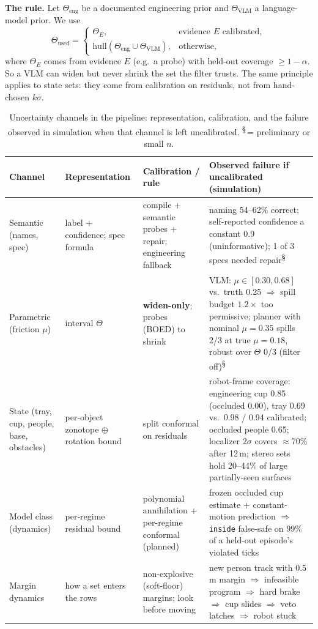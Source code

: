 \documentclass[10pt,twocolumn,letterpaper]{article}
\newcommand{\pre}{\textsuperscript{\S}}   %
\begin{document}
\textbf{The rule.} Let $\Theta_{\mathrm{eng}}$ be a documented engineering prior and $\Theta_{\mathrm{VLM}}$ a language-model prior. We use
\begin{equation}
\Theta_{\mathrm{used}}=\begin{cases}\Theta_E, & \text{evidence }E\text{ calibrated},\\
\mathrm{hull}(\Theta_{\mathrm{eng}}\cup\Theta_{\mathrm{VLM}}), & \text{otherwise,}\end{cases}
\end{equation}
where $\Theta_E$ comes from evidence $E$ (e.g.\ a probe) with held-out coverage $\ge1-\alpha$. So a VLM can widen but never shrink the set the filter trusts. The same principle applies to state sets: they come from calibration on
residuals, not from hand-chosen $k\sigma$.

\begin{table}[t]
\centering\footnotesize
\caption{Uncertainty channels in the pipeline: representation, calibration, and the failure observed in simulation when that channel
is left uncalibrated. \pre\,= preliminary or small $n$.}
\label{tab:uq}
\begin{tabular}{@{}p{2.6cm}p{2.9cm}p{3.3cm}p{7.3cm}@{}}
\toprule
Channel & Representation & Calibration / rule & Observed failure if uncalibrated (simulation)\\
\midrule
Semantic (names, spec) & label + confidence; spec formula & compile + semantic probes + repair; engineering fallback &
naming 54--62\% correct; self-reported confidence a constant 0.9 (uninformative); 1 of 3 specs needed repair\pre\\
Parametric (friction $\mu$) & interval $\Theta$ & \textbf{widen-only}; probes (BOED) to shrink &
VLM: $\mu\in[0.30,0.68]$ vs.\ truth 0.25 $\Rightarrow$ spill budget $1.2\times$ too permissive; planner with nominal $\mu{=}0.35$ spills 2/3 at true $\mu{=}0.18$, robust over $\Theta$ 0/3 (filter off)\pre\\
State (tray, cup, people, base, obstacles) & per-object zonotope $\oplus$ rotation bound & split conformal on residuals &
robot-frame coverage: engineering cup 0.85 (occluded 0.00), tray 0.69 vs.\ 0.98 / 0.94 calibrated; occluded people 0.65; localizer $2\sigma$ covers $\approx$70\% after 12\,m; stereo sets hold 20--44\% of large partially-seen surfaces\\
Model class (dynamics) & per-regime residual bound & polynomial annihilation + per-regime conformal (planned) &
frozen occluded cup estimate + constant-motion prediction $\Rightarrow$ \texttt{inside} false-safe on 99\% of a held-out episode's violated ticks\\
Margin dynamics & how a set enters the rows & non-explosive (soft-floor) margins; look before moving &
new person track with 0.5\,m margin $\Rightarrow$ infeasible program $\Rightarrow$ hard brake $\Rightarrow$ cup slides $\Rightarrow$ veto latches $\Rightarrow$ robot stuck\\
\bottomrule
\end{tabular}
\vspace{-2mm}
\end{table}
\end{document}
